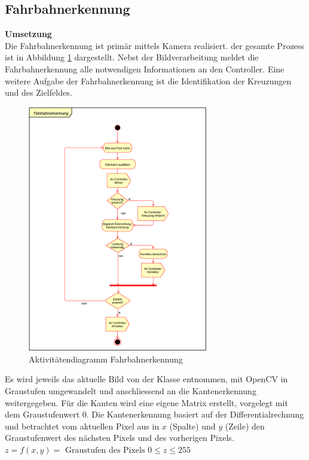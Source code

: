 \subsection{Fahrbahnerkennung}
\textbf{Umsetzung}\\[0.2cm]
Die Fahrbahnerkennung ist primär mittels Kamera realisiert. der gesamte Prozess ist in Abbildung \ref{fig:activityRoute} dargestellt. Nebst der Bildverarbeitung meldet die Fahrbahnerkennung alle notwendigen Informationen an den Controller. Eine weitere Aufgabe der Fahrbahnerkennung ist die Identifikation der Kreuzungen und des Zielfeldes.
\begin{figure}[H]%
\centering
\includegraphics[width=0.7\textwidth]{03_Loesungskonzept/pictures/Fahrbahnerkennung.png}
\caption{Aktivitätendiagramm Fahrbahnerkennung}
\label{fig:activityRoute}
\end{figure}
Es wird jeweils das aktuelle Bild von der Klasse  entnommen, mit OpenCV in Graustufen umgewandelt und anschliessend an die Kantenerkennung weitergegeben. Für die Kanten wird eine eigene Matrix erstellt, vorgelegt mit dem Graustufenwert 0. Die Kantenerkennung basiert auf der Differentialrechnung und betrachtet vom aktuellen Pixel aus in $x$ (Spalte) und $y$ (Zeile) den Graustufenwert des nächsten Pixels und des vorherigen Pixels.
$z = f(x,y) = \text{ Graustufen des Pixels }0 \leq z \leq 255$\\
